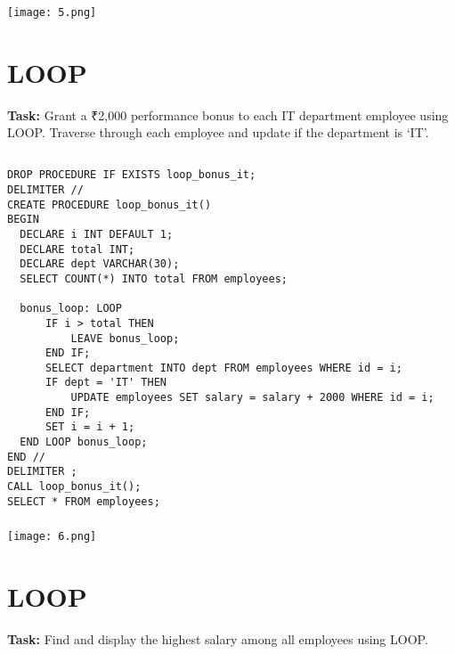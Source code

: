 \documentclass[12pt,a4paper]{article}
\begin{document}
\subsubsection{}
\begin{center}
    \texttt{[image: 5.png]}
\end{center}


\section{LOOP}
\textbf{Task:} Grant a ₹2,000 performance bonus to each IT department employee using
LOOP.
Traverse through each employee and update if the department is ‘IT’.

\subsection{}
\begin{lstlisting}
DROP PROCEDURE IF EXISTS loop_bonus_it;
DELIMITER //
CREATE PROCEDURE loop_bonus_it()
BEGIN
  DECLARE i INT DEFAULT 1;
  DECLARE total INT;
  DECLARE dept VARCHAR(30);
  SELECT COUNT(*) INTO total FROM employees;

  bonus_loop: LOOP
      IF i > total THEN
          LEAVE bonus_loop;
      END IF;
      SELECT department INTO dept FROM employees WHERE id = i;
      IF dept = 'IT' THEN
          UPDATE employees SET salary = salary + 2000 WHERE id = i;
      END IF;
      SET i = i + 1;
  END LOOP bonus_loop;
END //
DELIMITER ;
CALL loop_bonus_it();
SELECT * FROM employees;

\end{lstlisting}

\subsubsection{}
\begin{center}
    \texttt{[image: 6.png]}
\end{center}


\section{LOOP}
\textbf{Task:} Find and display the highest salary among all employees using LOOP.
\end{document}
